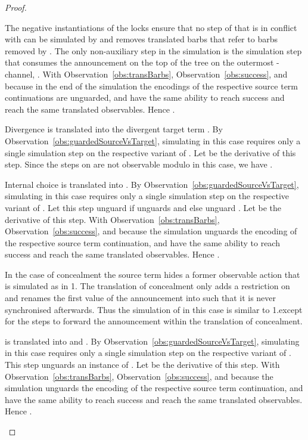 \documentclass[]{eptcs}
\begin{document}
\begin{proof}
\begin{compactitem}
\begin{compactenum}
					The negative instantiations of the locks ensure that no step of  that is in conflict with  can be simulated by  and removes translated barbs that refer to barbs removed by .
					The only non-auxiliary step in the simulation  is the simulation step that consumes the announcement on the top of the tree on the outermost -channel, \ie . With Observation~\ref{obs:transBarbs}, Observation~\ref{obs:success}, and because in the end of the simulation the encodings of the respective source term continuations are unguarded,  and  have the same ability to reach success and reach the same translated observables. Hence .
				\item Divergence is translated into the divergent target term . By Observation~\ref{obs:guardedSourceVsTarget}, simulating  in this case requires only a single simulation step on the respective variant of . Let  be the derivative of this step. Since the steps on  are not observable modulo  in this case, we have .
				\item Internal choice  is translated into . By Observation~\ref{obs:guardedSourceVsTarget}, simulating  in this case requires only a single simulation step on the respective variant of . Let this step unguard  if  unguards  and else unguard . Let  be the derivative of this step. With Observation~\ref{obs:transBarbs}, Observation~\ref{obs:success}, and because the simulation unguards the encoding of the respective source term continuation,  and  have the same ability to reach success and reach the same translated observables. Hence .
				\item In the case of concealment the source term hides a former observable action that is simulated as in 1. The translation of concealment only adds a restriction on  and renames the first value of the announcement into  such that it is never synchronised afterwards. Thus the simulation of  in this case is similar to 1.\@ except for the steps to forward the announcement within the translation of concealment.
				\item  is translated into  and . By Observation~\ref{obs:guardedSourceVsTarget}, simulating  in this case requires only a single simulation step on the respective variant of . This step unguards an instance of . Let  be the derivative of this step. With Observation~\ref{obs:transBarbs}, Observation~\ref{obs:success}, and because the simulation unguards the encoding of the respective source term continuation,  and  have the same ability to reach success and reach the same translated observables. Hence .
			\end{compactenum}

\end{compactitem}
\end{proof}
\end{document}
